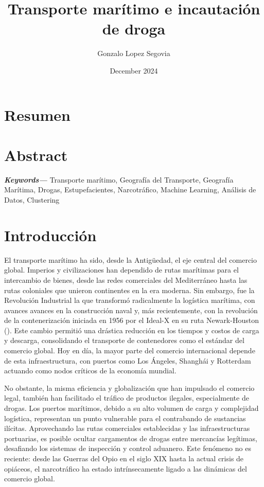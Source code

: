\documentclass[12pt]{article}
\title{Transporte marítimo e incautación de droga}
\author{Gonzalo Lopez Segovia}
\date{December 2024}
\providecommand{\keywords}[1]
{
	\small	
	\textbf{\textit{Keywords---}} #1
}
\begin{document}
	

	
\Large

\maketitle

\newpage

\section{\label{resumen}Resumen}

\section{\label{abstract}Abstract}


\keywords{Transporte marítimo, Geografía del Transporte, Geografía Marítima, Drogas, Estupefacientes, Narcotráfico, Machine Learning, Análisis de Datos, Clustering}

\newpage

\section{\label{intro}Introducción}
	El transporte marítimo ha sido, desde la Antigüedad, el eje central del comercio global. Imperios y civilizaciones han dependido de rutas marítimas para el intercambio de bienes, desde las redes comerciales del Mediterráneo hasta las rutas coloniales que unieron continentes en la era moderna. Sin embargo, fue la Revolución Industrial la que transformó radicalmente la logística marítima, con avances avances en la construcción naval y, más recientemente, con la revolución de la contenerización iniciada en 1956 por el Ideal-X en su ruta Newark-Houston (\cite{wired2012container}). Este cambio permitió una drástica reducción en los tiempos y costos de carga y descarga, consolidando el transporte de contenedores como el estándar del comercio global. Hoy en día, la mayor parte del comercio internacional depende de esta infraestructura, con puertos como Los Ángeles, Shanghái y Rotterdam actuando como nodos críticos de la economía mundial.
	
	No obstante, la misma eficiencia y globalización que han impulsado el comercio legal, también han facilitado el tráfico de productos ilegales, especialmente de drogas. Los puertos marítimos, debido a su alto volumen de carga y complejidad logística, representan un punto vulnerable para el contrabando de sustancias ilícitas. Aprovechando las rutas comerciales establecidas y las infraestructuras portuarias, es posible ocultar cargamentos de drogas entre mercancías legítimas, desafiando los sistemas de inspección y control aduanero. Este fenómeno no es reciente: desde las Guerras del Opio en el siglo XIX hasta la actual crisis de opiáceos, el narcotráfico ha estado intrínsecamente ligado a las dinámicas del comercio global.
	
\end{document}
